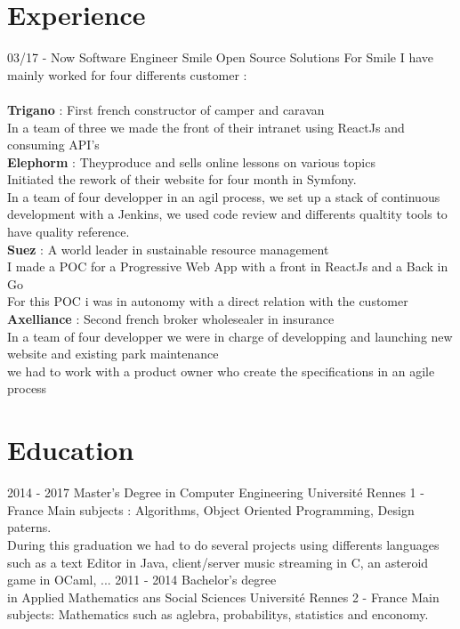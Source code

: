 \documentclass{friggeri-cv}
\begin{document}
\section{Experience}
\begin{entrylist}
	\entry
	{03/17 - Now}
	{Software Engineer}
	{Smile Open Source Solutions}
	{
		For Smile I have mainly worked for four differents customer : \\
		\\
		\textbf{Trigano} : First french constructor of camper and caravan \\
			In a team of three we made the front of their intranet using ReactJs and consuming API's \\
		\textbf{Elephorm} : Theyproduce and sells online lessons on various topics \\ 
			Initiated the rework of their website for four month in Symfony. \\
			In a team of four developper in an agil process, we set up a stack of continuous development with a Jenkins, we used code review and differents qualtity tools to have quality reference. \\
		\textbf{Suez} : A world leader in sustainable resource management \\
				I made a POC for a Progressive Web App with a front in ReactJs and a Back in Go \\
				For this POC i was in autonomy with a direct relation with the customer \\
		\textbf{Axelliance} : Second french broker wholesealer in insurance \\
			In a team of four developper we were in charge of developping and launching new website and existing park maintenance \\
			we had to work with a product owner who create the specifications in an agile process 
	}
\end{entrylist}

\section{Education}
\begin{entrylist}
	\entry
	{2014 - 2017}
	{Master's Degree in Computer Engineering}
	{Université Rennes 1 - France}
	{Main subjects : Algorithms, Object Oriented Programming, Design paterns. \\
	During this graduation we had to do several projects using differents languages \\
	such as a text Editor in Java, client/server music streaming in C, an asteroid game in OCaml, ...
	}
	\entry
	{2011 - 2014}
	{Bachelor's degree \\in Applied Mathematics ans Social Sciences }
	{Université Rennes 2 - France}
	{Main subjects: Mathematics such as aglebra, probabilitys, statistics and enconomy.}
\end{entrylist}
\end{document}

